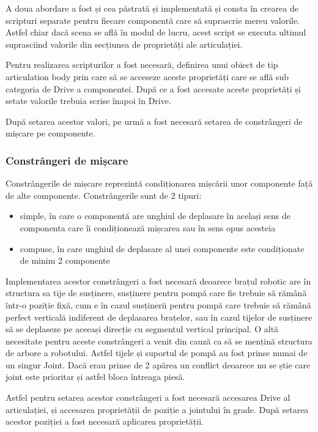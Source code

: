 A doua abordare a fost și cea păstrată și implementată și consta în crearea de scripturi separate pentru fiecare componentă care să suprascrie mereu valorile. Astfel chiar dacă scena se află în modul de lucru, acest script se executa ultimul suprasciind valorile din secțiunea de proprietăți ale articulației. 

Pentru realizarea scripturilor a fost necesară, definirea unui obiect de tip articulation body prin care să se acceseze aceste proprietăți care se află sub categoria de Drive a componentei. După ce a fost accesate aceste proprietăți și setate valorile trebuia scrise înapoi în Drive.

După setarea acestor valori, pe urmă a fost necesară setarea de constrângeri de mișcare pe componente.

\subsubsection{Constrângeri de mișcare}

Constrângerile de mișcare reprezintă condiționarea mișcării unor componente față de alte componente. Constrângerile sunt de 2 tipuri:
\begin{itemize}
	\item simple, în care o componentă are unghiul de deplasare în același sens de componenta care îi condiționează mișcarea sau în sens opus acesteia
	\item compuse, în care unghiul de deplasare al unei componente este condiționate de minim 2 componente
\end{itemize}

Implementarea acestor constrângeri a fost necesară deoarece brațul robotic are în structura sa tije de susținere, susținere pentru pompă care fie trebuie să rămână într-o poziție fixă, cum e în cazul susținerii pentru pompă care trebuie să rămână perfect verticală indiferent de deplasarea brațelor, sau în cazul tijelor de susținere să se deplaseze pe aceeași direcție cu segmentul vertical principal. O altă necesitate pentru aceste constrângeri a venit din cauză ca să se mențină structura de arbore a robotului. Astfel tijele și suportul de pompă au fost prinse numai de un singur Joint. Dacă erau prinse de 2 apărea un conflict deoarece nu se știe care joint este prioritar și astfel bloca întreaga piesă.

Astfel pentru setarea acestor constrângeri a fost necesară accesarea Drive al articulației, și accesarea proprietății de poziție a jointului în grade. După setarea acestor poziției a fost necesară aplicarea proprietății.

